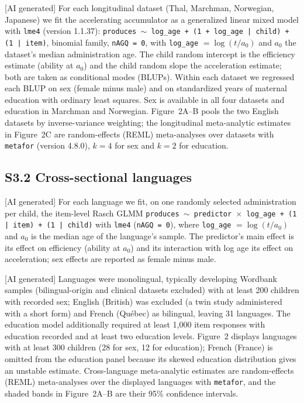 [AI generated] For each longitudinal dataset (Thal, Marchman, Norwegian,
Japanese) we fit the accelerating accumulator as a generalized linear mixed model
with \texttt{lme4} (version 1.1.37): \texttt{produces $\sim$ log\_age + (1 +
log\_age | child) + (1 | item)}, binomial family, \texttt{nAGQ = 0}, with
\texttt{log\_age} $= \log(t / a_0)$ and $a_0$ the dataset's median administration
age. The child random intercept is the efficiency estimate (ability at $a_0$) and
the child random slope the acceleration estimate; both are taken as conditional
modes (BLUPs). Within each dataset we regressed each BLUP on sex (female minus
male) and on standardized years of maternal education with ordinary least
squares. Sex is available in all four datasets and education in Marchman and
Norwegian. Figure~2A--B pools the two English datasets by inverse-variance
weighting; the longitudinal meta-analytic estimates in Figure~2C are
random-effects (REML) meta-analyses over datasets with \texttt{metafor} (version
4.8.0), $k = 4$ for sex and $k = 2$ for education.

\subsection*{S3.2 Cross-sectional languages}

[AI generated] For each language we fit, on one randomly selected administration
per child, the item-level Rasch GLMM \texttt{produces $\sim$ predictor $\times$
log\_age + (1 | item) + (1 | child)} with \texttt{lme4} (\texttt{nAGQ = 0}), where
\texttt{log\_age} $= \log(t / a_0)$ and $a_0$ is the median age of the language's
sample. The predictor's main effect is its effect on efficiency (ability at
$a_0$) and its interaction with log age its effect on acceleration; sex effects are
reported as female minus male.

[AI generated] Languages were monolingual, typically developing Wordbank samples
(bilingual-origin and clinical datasets excluded) with at least 200 children with
recorded sex; English (British) was excluded (a twin study administered with a
short form) and French (Qu\'ebec) as bilingual, leaving 31 languages. The
education model additionally required at least 1,000 item responses with education
recorded and at least two education levels. Figure~2 displays languages with at
least 300 children (28 for sex, 12 for education); French (France) is omitted
from the education panel because its skewed education distribution gives an
unstable estimate. Cross-language meta-analytic estimates are random-effects
(REML) meta-analyses over the displayed languages with \texttt{metafor}, and the
shaded bands in Figure~2A--B are their 95\% confidence intervals.

